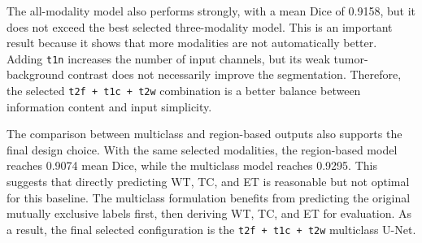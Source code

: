 The all-modality model also performs strongly, with a mean Dice of 0.9158, but it does not exceed the best selected three-modality model. This is an important result because it shows that more modalities are not automatically better. Adding \texttt{t1n} increases the number of input channels, but its weak tumor-background contrast does not necessarily improve the segmentation. Therefore, the selected \texttt{t2f + t1c + t2w} combination is a better balance between information content and input simplicity.

The comparison between multiclass and region-based outputs also supports the final design choice. With the same selected modalities, the region-based model reaches 0.9074 mean Dice, while the multiclass model reaches 0.9295. This suggests that directly predicting WT, TC, and ET is reasonable but not optimal for this baseline. The multiclass formulation benefits from predicting the original mutually exclusive labels first, then deriving WT, TC, and ET for evaluation. As a result, the final selected configuration is the \texttt{t2f + t1c + t2w} multiclass U-Net.
